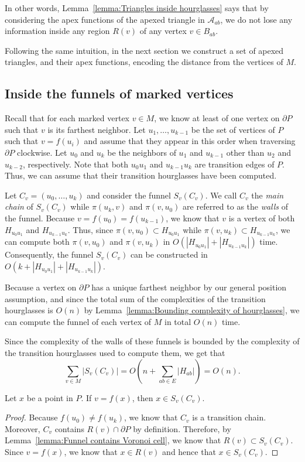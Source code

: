 \documentclass[a4paper,UKenglish]{lipics}
\newcommand{\fn}[2]{\ensuremath{S_{\scriptscriptstyle #1}(#2)}}
\newcommand{\ff}[1]{\ensuremath{f(#1)}}
\newcommand{\p}[2]{\ensuremath{\pi(#1, #2)}}
\begin{document}
In other words, Lemma~\ref{lemma:Triangles inside hourglasses} says that by considering the apex functions of the apexed triangle in $\mathcal A_{ab}$, we do not lose any information inside any region $R(v)$ of any vertex $v\in B_{ab}$.

Following the same intuition, in the next section we construct a set of apexed triangles, and their apex functions, encoding the distance from the vertices of $M$.

\subsection{Inside the funnels of marked vertices}
Recall that for each marked vertex $v\in M$, we know at least of one vertex on $\partial P$ such that $v$ is its farthest neighbor.
Let $u_1, \ldots, u_{k-1}$ be the set of vertices of $P$ such that $v = \ff{u_i}$ and assume that they appear in this order when traversing $\partial P$ clockwise. Let $u_0$ and $u_k$ be the neighbors of $u_1$ and $u_{k-1}$ other than $u_2$ and $u_{k-2}$, respectively. Note that both $u_0 u_1$ and $u_{k-1}u_k$ are transition edges of $P$. Thus, we can assume that their transition hourglasses have been computed.

Let $C_v = (u_0, \ldots, u_k)$ and consider the funnel $\fn{v}{C_v}$.
We call $C_v$ the \emph{main chain} of $\fn{v}{C_v}$ while $\p{u_k}{ v}$ and $\p{v}{ u_0}$ are referred to as the \emph{walls} of the funnel.  
Because $v = \ff{u_0} = \ff{u_{k-1}}$, we know that $v$ is a vertex of both $H_{u_0 u_1}$ and  $H_{u_{k-1}u_k}$. 
Thus, since $\p{v}{ u_0}\subset H_{u_0u_1}$ while $\p{v}{u_k}\subset H_{u_{k-1}u_k}$, we can compute both $\p{v}{ u_0}$ and $\p{v}{u_k}$ in $O( |H_{u_0 u_1}| + |H_{u_{k-1}u_k}|)$ time.
Consequently, the funnel $\fn{v}{C_v}$ can be constructed in $O(k + |H_{u_0 u_1}| + |H_{u_{k-1}u_k}|)$. 

Because a vertex on $\partial P$ has a unique farthest neighbor by our general position assumption, and since the total sum of the complexities of the transition hourglasses is $O(n)$ by Lemma~\ref{lemma:Bounding complexity of hourglasses}, we can compute the funnel of each vertex of $M$ in total $O(n)$ time. 

Since the complexity of the walls of these funnels is bounded by the complexity of the transition hourglasses used to compute them, we get that $$\sum_{v\in M} |\fn{v}{C_v}|  = O\left(n + \sum_{ab\in E} |H_{ab}|\right) = O(n).$$

\begin{lemma}\label{lemma:Farthest points from marked are in funnel}
Let $x$ be a point in $P$. If $v = \ff{x}$, then $x\in \fn{v}{C_v}$.
\end{lemma}
\begin{proof}
Because $\ff{u_0} \neq \ff{u_k}$, we know that $C_v$ is a transition chain. Moreover, $C_v$ contains $R(v)\cap \partial P$ by definition. Therefore, by Lemma~\ref{lemma:Funnel contains Voronoi cell}, we know that $R(v)\subset \fn{v}{C_v}$.
Since $v = \ff{x}$, we know that $x\in R(v)$ and hence that $x \in \fn{v}{C_v}$. 
\end{proof}
\end{document}
